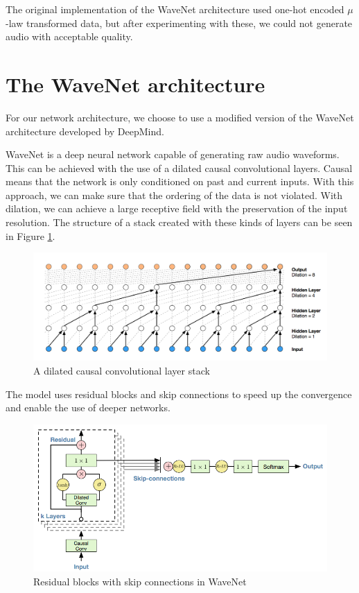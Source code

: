 \documentclass{article}
\begin{document}
	The original implementation of the WaveNet architecture used one-hot encoded $\mu$-law transformed data, but after experimenting with these, we could not generate audio with acceptable quality.


	\section{The WaveNet architecture}
	\label{sec:wavenet}
	For our network architecture, we choose to use a modified version of the WaveNet\cite{wavenet} architecture developed by DeepMind.

	WaveNet is a deep neural network capable of generating raw audio waveforms. This can be achieved with the use of a dilated causal convolutional layers. Causal means that the network is only conditioned on past and current inputs. With this approach, we can make sure that the ordering of the data is not violated. With dilation, we can achieve a large receptive field with the preservation of the input resolution. The structure of a stack created with these kinds of layers can be seen in Figure \ref{fig:dccs}.
	
		
	\begin{figure}[H]
		\centering
		\includegraphics[width=.8\linewidth]{dccs.png}
		\caption{A dilated causal convolutional layer stack}
		\label{fig:dccs}
	\end{figure}
	
	The model uses residual blocks and skip connections to speed up the convergence and enable the use of deeper networks.
	
	\begin{figure}[H]
		\centering
		\includegraphics[width=.8\linewidth]{residual.png}
		\caption{Residual blocks with skip connections in WaveNet}
		\label{fig:residual}
	\end{figure}
\end{document}
